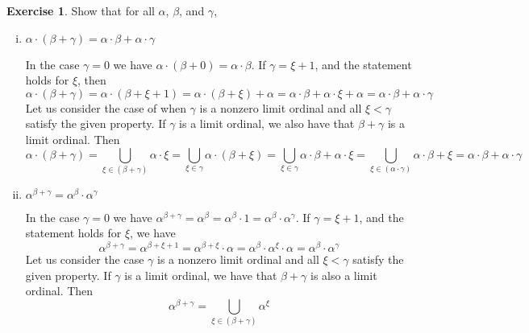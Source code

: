 \documentclass{article}
\theoremstyle{definition}
\newtheorem{exer}{Exercise}[section]
\newlength{\defparindent}
\newenvironment{answer}
    {\begin{mdframed}[backgroundcolor=gray!15, linewidth=0pt] \setlength{\parindent}{\defparindent}}
    {\end{mdframed}}
\begin{document}
\newpage

\begin{exer}
    Show that for all $\alpha$, $\beta$, and $\gamma$, 
    \begin{enumerate}[(i)]
        \item $\alpha \cdot (\beta + \gamma) = \alpha \cdot \beta + \alpha \cdot \gamma$
        
        \begin{answer}
            In the case $\gamma = 0$ we have $\alpha \cdot (\beta + 0) = \alpha \cdot \beta$. If $\gamma = \xi + 1$, and the statement holds for $\xi$, then 
            \[
                \alpha \cdot (\beta + \gamma) = \alpha \cdot (\beta + \xi + 1) = \alpha \cdot (\beta + \xi) + \alpha = \alpha \cdot \beta + \alpha \cdot \xi + \alpha = \alpha \cdot \beta + \alpha \cdot \gamma
            \]
            Let us consider the case of when $\gamma$ is a nonzero limit ordinal and all $\xi < \gamma$ satisfy the given property. If $\gamma$ is a limit ordinal, we also have that $\beta + \gamma$ is a limit ordinal. Then
            \[
                \alpha \cdot (\beta + \gamma) = 
                \bigcup_{\xi \in (\beta + \gamma)} \alpha \cdot \xi
                =
                \bigcup_{\xi \in \gamma} \alpha \cdot (\beta + \xi)  
                =
                \bigcup_{\xi \in \gamma} \alpha \cdot \beta + \alpha \cdot \xi
                =
                \bigcup_{\xi \in (\alpha \cdot \gamma)} \alpha \cdot \beta +  \xi
                =   
                \alpha \cdot \beta + \alpha \cdot \gamma 
            \]
        \end{answer}
        \item $\alpha^{\beta + \gamma} = \alpha^{\beta} \cdot \alpha^{\gamma}$
        \begin{answer}        
            In the case $\gamma = 0$ we have $\alpha^{\beta + \gamma} = \alpha^\beta = \alpha^\beta \cdot 1 = \alpha^\beta \cdot \alpha^\gamma$. If $\gamma = \xi + 1$, and the statement holds for $\xi$,  we have 
            \[
                \alpha^{\beta + \gamma} = \alpha^{\beta + \xi + 1} = \alpha^{\beta + \xi} \cdot \alpha = \alpha^{\beta} \cdot \alpha^{\xi} \cdot \alpha 
                = \alpha^{\beta} \cdot \alpha^{\gamma}
            \]
            Let us consider the case $\gamma$ is a nonzero limit ordinal and all $\xi < \gamma$ satisfy the given property. If $\gamma$ is a limit ordinal, we have that $\beta + \gamma$ is also a limit ordinal. Then 
            \[
                \alpha^{\beta + \gamma} 
                = 
                \bigcup_{\xi \in (\beta + \gamma)} \alpha^{\xi}
\]
\end{answer}
\end{enumerate}
\end{exer}
\end{document}
